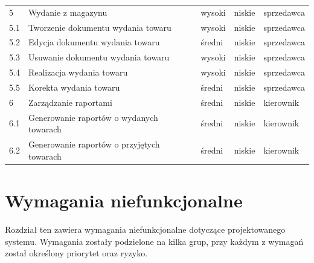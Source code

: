 \begin{table}[ht]
\begin{center}
\begin{tabular}{| l | l | l | l | l |}
		   	5 & Wydanie z magazynu & wysoki & niskie & sprzedawca \\
		   	5.1 & Tworzenie dokumentu wydania towaru & wysoki & niskie & sprzedawca \\
		   	5.2 & Edycja dokumentu wydania towaru & średni & niskie & sprzedawca \\
		   	5.3 & Usuwanie dokumentu wydania towaru & wysoki & niskie & sprzedawca \\
		   	5.4 & Realizacja wydania towaru & wysoki & niskie & sprzedawca \\
		   	5.5 & Korekta wydania towaru & średni & niskie & sprzedawca \\
		   	\hline
		   	6 & Zarządzanie raportami & średni & niskie & kierownik \\
		   	6.1 & Generowanie raportów o wydanych towarach & średni & niskie & kierownik \\
		   	6.2 & Generowanie raportów o przyjętych towarach & średni & niskie & kierownik \\
		   	\hline
	    \end{tabular}
	\end{center}
\end{table}
\FloatBarrier
\newpage

\section{Wymagania niefunkcjonalne}

Rozdział ten zawiera wymagania niefunkcjonalne dotyczące projektowanego systemu.
Wymagania zostały podzielone na kilka grup, przy każdym z wymagań został
określony priorytet oraz ryzyko.


